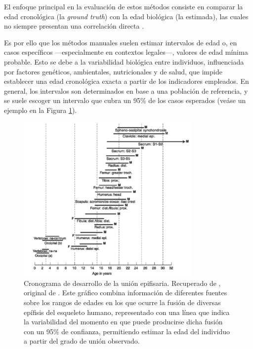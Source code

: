 El enfoque principal en la evaluación de estos métodos consiste en comparar la edad cronológica (la \textit{ground truth}) con la edad biológica (la estimada), las cuales no siempre presentan una correlación directa \cite{marquez2015}.

Es por ello que los métodos manuales suelen estimar intervalos de edad o, en casos específicos ---especialmente en contextos legales---, valores de edad mínima probable. Esto se debe a la variabilidad biológica entre individuos, influenciada por factores genéticos, ambientales, nutricionales y de salud, que impide establecer una edad cronológica exacta a partir de los indicadores empleados. En general, los intervalos son determinados en base a una población de referencia, y se suele escoger un intervalo que cubra un 95\% de los casos esperados \cite{garvin2012} (veáse un ejemplo en la Figura \ref{fig:range_values_epiphyselial}).

\begin{figure}[htbp]
    \centering
    \includegraphics[width=0.8\textwidth]{capitulos/cap_03/imagenes/range_values_epiphyselial.png}
    \caption[
        Cronograma de desarrollo de la unión epifisaria. Recuperado de \cite{byers2023}, original de \cite{buikstra1994}.
    ]{
        Cronograma de desarrollo de la unión epifisaria. Recuperado de \cite{byers2023}, original de \cite{buikstra1994}. 
        Este gráfico combina información de diferentes fuentes sobre los rangos de edades en los que ocurre la fusión de diversas epífisis del esqueleto humano, representado con una línea que indica la variabilidad del momento en que puede producirse dicha fusión con un 95\% de confianza, permitiendo estimar la edad del individuo a partir del grado de unión observado.
    }
    \label{fig:range_values_epiphyselial}
\end{figure}

